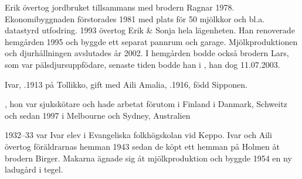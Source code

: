Erik övertog jordbruket tillsammans med brodern Ragnar 1978. 	Ekonomibyggnaden förstorades 1981 med plats för 50 mjölkkor och bl.a. datastyrd utfodring. 1993 övertog Erik \& Sonja hela lägenheten. Han renoverade hemgården 1995 och byggde ett separat pannrum och garage. Mjölkproduktionen och djurhållningen avslutades år 2002. I hemgården bodde också brodern Lars, som var pälsdjursuppfödare, senaste tiden bodde han i , han dog 11.07.2003.


Ivar, .1913 på Tollikko, gift med Aili Amalia, .1916, född Sipponen.
\begin{jhchildren}
  \item {}, hon var sjukskötare och hade arbetat förutom i Finland i Danmark, Schweitz och sedan 1997 i Melbourne och Sydney, Australien
  \item {}
  \item {}
  \item {}
  \item {}
\end{jhchildren}
1932--33 var Ivar elev i Evangeliska folkhögskolan vid Keppo. Ivar och Aili övertog föräldrarnas hemman 1943 sedan de köpt ett hemman på Holmen åt brodern Birger. Makarna ägnade sig åt mjölkproduktion och byggde 1954 en ny ladugård i tegel.


